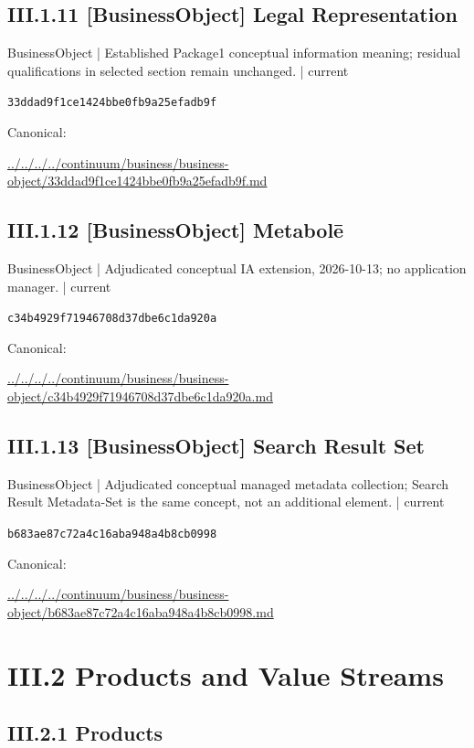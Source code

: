 \documentclass[10pt,a4paper]{article}
\begin{document}
\subsection*{III.1.11 [BusinessObject] Legal Representation}
\label{element-33ddad9f1ce1424bbe0fb9a25efadb9f}
{\small BusinessObject | Established Package1 conceptual information meaning; residual qualifications in selected section remain unchanged. | current}\par
\texttt{33ddad9f1ce1424bbe0fb9a25efadb9f}\par
Canonical: \par
{\footnotesize\url{../../../../continuum/business/business-object/33ddad9f1ce1424bbe0fb9a25efadb9f.md}}\par
\subsection*{III.1.12 [BusinessObject] Metabolē}
\label{element-c34b4929f71946708d37dbe6c1da920a}
{\small BusinessObject | Adjudicated conceptual IA extension, 2026-10-13; no application manager. | current}\par
\texttt{c34b4929f71946708d37dbe6c1da920a}\par
Canonical: \par
{\footnotesize\url{../../../../continuum/business/business-object/c34b4929f71946708d37dbe6c1da920a.md}}\par
\subsection*{III.1.13 [BusinessObject] Search Result Set}
\label{element-b683ae87c72a4c16aba948a4b8cb0998}
{\small BusinessObject | Adjudicated conceptual managed metadata collection; Search Result Metadata-Set is the same concept, not an additional element. | current}\par
\texttt{b683ae87c72a4c16aba948a4b8cb0998}\par
Canonical: \par
{\footnotesize\url{../../../../continuum/business/business-object/b683ae87c72a4c16aba948a4b8cb0998.md}}\par
\section*{III.2 Products and Value Streams}
\subsection*{III.2.1 Products}
\end{document}
